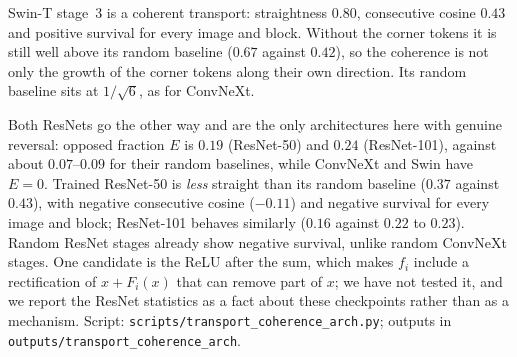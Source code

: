 Swin-T stage~3 is a coherent transport: straightness $0.80$, consecutive cosine $0.43$
and positive survival for every image and block.
Without the corner tokens it is still well above its random baseline ($0.67$ against
$0.42$), so the coherence is not only the growth of the corner tokens along their own
direction.
Its random baseline sits at $1/\sqrt 6$, as for ConvNeXt.

Both ResNets go the other way and are the only architectures here with genuine
reversal: opposed fraction $E$ is $0.19$ (ResNet-50) and $0.24$ (ResNet-101), against
about $0.07$--$0.09$ for their random baselines, while ConvNeXt and Swin have $E{=}0$.
Trained ResNet-50 is \emph{less} straight than its random baseline ($0.37$ against
$0.43$), with negative consecutive cosine ($-0.11$) and negative survival for every
image and block; ResNet-101 behaves similarly ($0.16$ against $0.22$ to $0.23$).
Random ResNet stages already show negative survival, unlike random ConvNeXt stages.
One candidate is the ReLU after the sum, which makes $f_i$ include a rectification of
$x+F_i(x)$ that can remove part of $x$; we have not tested it, and we report the ResNet
statistics as a fact about these checkpoints rather than as a mechanism.
Script: \texttt{scripts/transport\_coherence\_arch.py}; outputs in
\texttt{outputs/transport\_coherence\_arch}.
